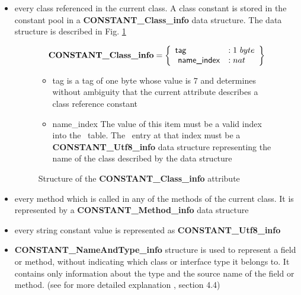 \begin{itemize}
\item every class referenced in the current class.  A class constant is stored in the constant pool
         in a  \textbf{CONSTANT\_Class\_info} data structure. The data structure is described in Fig. \ref{clsConstant} 
  \begin{figure}
$$
\mbox{\rm\textbf{CONSTANT\_Class\_info}} =  \left\{\begin{array}{ll} 
                                                   \mbox{\rm\textsf{tag}}    & :  1 \ byte \\
                                                   \mbox{\rm\textsf{ name\_index}}     & :   nat \\
						  
	                        \end{array} \right\}$$

\begin{itemize}
\item \textsf{tag} is a tag of one byte  whose value is 7 and  determines without 
       ambiguity that the current attribute describes a class  reference constant

\item \textsf{name\_index} The value of this item must be a valid index into the \constantPool \ table. The \constantPool \ entry at that index must be a
       \textbf{ CONSTANT\_Utf8\_info} data structure representing the name of the class described by the data structure 
 \end{itemize}
\caption{ { \sc Structure of the } \textbf{CONSTANT\_Class\_info} { \sc attribute }  }
\label{clsConstant}
\end{figure}
  
 \item every method which is called in any of the methods
of the current class. It is represented by a  \textbf{CONSTANT\_Method\_info} data structure
      
	
\item  every string constant value is represented as \textbf{CONSTANT\_Utf8\_info}
\item  \textbf{CONSTANT\_NameAndType\_info}  structure is used to represent a field or method, without indicating which class or interface type it belongs to.
       It contains only information about the type and the source name of the field or  method. 
       (see for more detailed explanation \cite{VMSpec}, section 4.4) 

\end{itemize}

